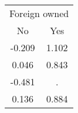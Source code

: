 \begin{tabular}{cc}
\toprule
\multicolumn{2}{c}{Foreign owned} \\
\cmidrule(lr){1-2}
No & Yes \\
\midrule
-0.209 & 1.102 \\
0.046 & 0.843 \\
-0.481 & . \\
0.136 & 0.884 \\
\bottomrule
\end{tabular}
